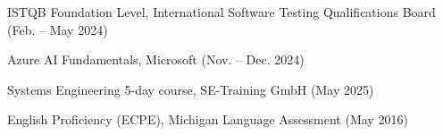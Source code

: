 
\begin{cvskills}

  \cvskill
    {ISTQB}
    {Foundation Level, International Software Testing Qualifications Board (Feb. -- May 2024)}

  \cvskill
    {Azure}
    {AI Fundamentals, Microsoft (Nov. -- Dec. 2024)}

  \cvskill
    {Systems Engineering}
    {5-day course, SE-Training GmbH (May 2025)}

  \cvskill
    {English}
    {Proficiency (ECPE), Michigan Language Assessment (May 2016)}

\end{cvskills}
